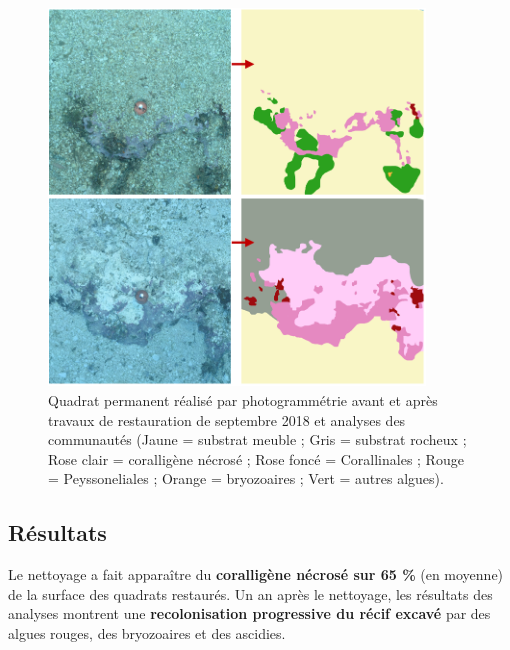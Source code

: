 \begin{figure}[htpb]
	\begin{center}
	\includegraphics[width=10cm]{images/appendix_merigeo/Figure4.PNG}
		\caption[Quadrat permanent réalisé par photogrammétrie avant et après travaux de restauration]{Quadrat permanent réalisé par photogrammétrie avant et après travaux de restauration de septembre 2018 et analyses des communautés (Jaune = substrat meuble ; Gris = substrat rocheux ; Rose clair = coralligène nécrosé ; Rose foncé = Corallinales ; Rouge = Peyssoneliales ; Orange = bryozoaires ; Vert = autres algues).}
	\label{figureB.4}
\end{center}
\end{figure}

\subsection*{Résultats}
Le nettoyage a fait apparaître du \textbf{coralligène nécrosé sur 65 \%} (en moyenne) de la surface des quadrats restaurés. Un an après le nettoyage, les résultats des analyses montrent une \textbf{recolonisation progressive du récif excavé} par des algues rouges, des bryozoaires et des ascidies.
